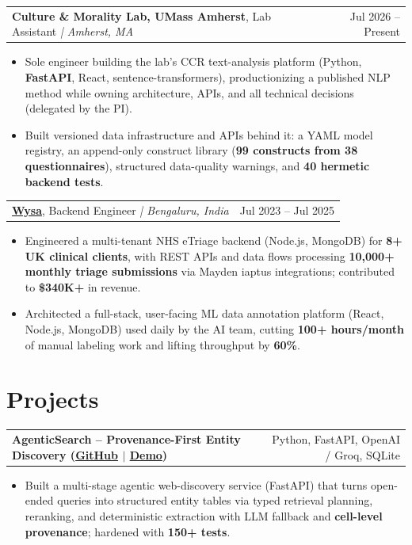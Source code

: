 \documentclass[letterpaper,11pt]{article}
\makeatletter
\newcommand{\expItem}[4]{%
  \vspace{2pt}
  \begin{tabular*}{\textwidth}{@{}l@{\extracolsep{\fill}}r@{}}
    \textbf{#1}, #2 \textit{| #3} & #4 \\
  \end{tabular*}\par\vspace{-3pt}
}
\newcommand{\projItem}[2]{%
  \vspace{2pt}
  \begin{tabular*}{\textwidth}{@{}l@{\extracolsep{\fill}}r@{}}
    \textbf{#1} & #2 \\
  \end{tabular*}\par\vspace{-3pt}
}
\makeatother
\begin{document}
\expItem{Culture \& Morality Lab, UMass Amherst}{Lab Assistant}{Amherst, MA}{Jul 2026 -- Present}
\begin{itemize}
  \item Sole engineer building the lab's CCR text-analysis platform (Python, \textbf{FastAPI}, React, sentence-transformers), productionizing a published NLP method while owning architecture, APIs, and all technical decisions (delegated by the PI).
  \item Built versioned data infrastructure and APIs behind it: a YAML model registry, an append-only construct library (\textbf{99 constructs from 38 questionnaires}), structured data-quality warnings, and \textbf{40 hermetic backend tests}.
\end{itemize}

\expItem{\href{https://www.wysa.io}{Wysa}}{Backend Engineer}{Bengaluru, India}{Jul 2023 -- Jul 2025}
\begin{itemize}
  \item Engineered a multi-tenant NHS eTriage backend (Node.js, MongoDB) for \textbf{8+ UK clinical clients}, with REST APIs and data flows processing \textbf{10{,}000+ monthly triage submissions} via Mayden iaptus integrations; contributed to \textbf{\$340K+} in revenue.
  \item Architected a full-stack, user-facing ML data annotation platform (React, Node.js, MongoDB) used daily by the AI team, cutting \textbf{100+ hours/month} of manual labeling work and lifting throughput by \textbf{60\%}.
\end{itemize}

\section{Projects}

\projItem{AgenticSearch -- Provenance-First Entity Discovery {\normalfont\small(\href{https://github.com/Deva-1903/ciir_agentic_search}{GitHub} $\vert$ \href{https://agentic-search-negglszkwa-uc.a.run.app}{Demo})}}{Python, FastAPI, OpenAI / Groq, SQLite}
\begin{itemize}
  \item Built a multi-stage agentic web-discovery service (FastAPI) that turns open-ended queries into structured entity tables via typed retrieval planning, reranking, and deterministic extraction with LLM fallback and \textbf{cell-level provenance}; hardened with \textbf{150+ tests}.
\end{itemize}
\end{document}
